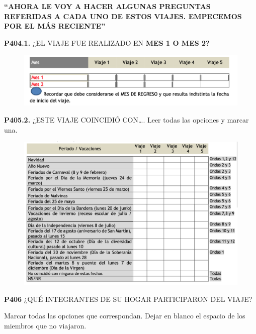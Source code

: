 \documentclass[
  openany]{book}
\begin{document}
\textbf{``AHORA LE VOY A HACER ALGUNAS PREGUNTAS REFERIDAS A CADA UNO DE ESTOS VIAJES. EMPECEMOS POR EL MÁS RECIENTE''}

\textbf{P404.1.} ¿EL VIAJE FUE REALIZADO EN \textbf{MES 1 O MES 2?}

\begin{figure}

{\centering \includegraphics[width=1\linewidth]{imagenes/figura6-177} 

}

\end{figure}

\textbf{P405.2.} ¿ESTE VIAJE COINCIDIÓ CON\ldots.
Leer todas las opciones y marcar una.

\begin{figure}

{\centering \includegraphics[width=1\linewidth]{imagenes/figura6-178} 

}

\end{figure}

\textbf{P406} ¿QUÉ INTEGRANTES DE SU HOGAR PARTICIPARON DEL VIAJE?

Marcar todas las opciones que correspondan. Dejar en blanco el espacio de los miembros que no viajaron.
\end{document}
